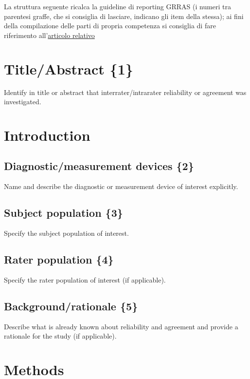 
La struttura seguente ricalca la guideline di reporting GRRAS (i
numeri tra parentesi graffe, che si consiglia di lasciare, indicano
gli item della stessa); ai fini della compilazione delle parti di
propria competenza si consiglia di fare riferimento all'\href{https://linkinghub.elsevier.com/retrieve/pii/S0895-4356(10)00097-1}{articolo relativo}

\section{Title/Abstract \{1\}}

Identify in title or abstract that interrater/intrarater reliability
or agreement was investigated.

\section{Introduction}

\subsection{Diagnostic/measurement devices \{2\}}

Name and describe the diagnostic or measurement device of interest
explicitly.

\subsection{Subject population \{3\}}

Specify the subject population of interest.

\subsection{Rater population \{4\}}

Specify the rater population of interest (if applicable).

\subsection{Background/rationale \{5\}}

Describe what is already known about reliability and agreement and
provide a rationale for the study (if applicable).

\section{Methods}

